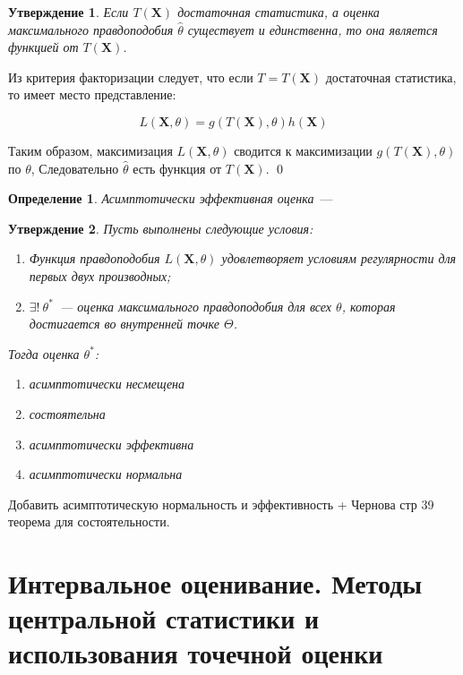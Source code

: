 \documentclass[oneside,final,14pt]{extreport}
\renewenvironment{proof}{{\bfseries Доказательство.}}{\qed}
\theoremstyle{plain}
\newtheorem*{thm*}{Утверждение}
\theoremstyle{definition}
\newtheorem*{defn}{Определение}
\theoremstyle{named}
\begin{document}
\begin{thm*}
Если $T(\mathbf{X})$ достаточная статистика, а оценка максимального правдоподобия $\hat{\theta}$ существует и единственна, то она является функцией от $T(\mathbf{X})$.
\end{thm*}

\begin{proof}
Из критерия факторизации следует, что если $T=T(\mathbf{X})$ достаточная статистика, то имеет место представление:

\begin{equation*}
    L(\mathbf{X}, \theta)=g(T(\mathbf{X}), \theta) h(\mathbf{X})
\end{equation*}

Таким образом, максимизация $L(\mathbf{X},\theta)$ сводится к максимизации $g(T(\mathbf{X}), \theta)$ по $\theta$, Следовательно $\hat{\theta}$ есть функция от $T(\mathbf{X})$.
\end{proof}

\begin{defn}
    {\it Асимптотически эффективная оценка}~---
\end{defn}

\begin{thm*}
    Пусть выполнены следующие условия:
    \begin{enumerate}
        \item Функция правдоподобия $L(\mathbf{X}, \theta)$ удовлетворяет условиям регулярности для первых двух производных;
        \item $\exists!~ \theta^{*}$~--- оценка максимального правдоподобия для всех $\theta$, которая достигается во внутренней точке $\Theta$.
    \end{enumerate}
    Тогда оценка $\theta^{*}$:
    \begin{enumerate}
        \item асимптотически несмещена
        \item состоятельна
        \item асимптотически эффективна
        \item асимптотически нормальна
    \end{enumerate}
\end{thm*}

Добавить асимптотическую нормальность и эффективность + Чернова стр 39 теорема для состоятельности.

\section{Интервальное оценивание. Методы центральной статистики и использования точечной оценки}
\end{document}
